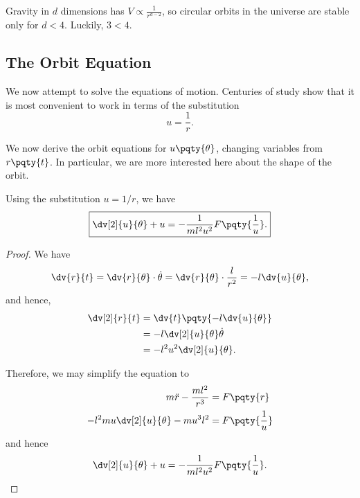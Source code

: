 Gravity in \(d\) dimensions has \(V \propto \frac{1}{r^{d - 2}}\), so circular orbits in the universe are stable only for \(d < 4\). Luckily, \(3 < 4\).

\subsection{The Orbit Equation}

We now attempt to solve the equations of motion. Centuries of study show that it is most convenient to work in terms of the substitution
\begin{equation}
    u = \frac{1}{r}.
\end{equation}

We now derive the orbit equations for \(u\pqty{\theta}\), changing variables from \(r\pqty{t}\). In particular, we are more interested here about the shape of the orbit.

\begin{lemma}
    \label{lem:orbit-equation}%
    Using the substitution \(u = 1 / r\), we have
    \begin{equation}
        \boxed{\dv[2]{u}{\theta} + u = - \frac{1}{ml^2 u^2} F\pqty{\frac{1}{u}}.}
    \end{equation}
\end{lemma}

\begin{proof}
    We have
    \begin{equation}
        \dv{r}{t} = \dv{r}{\theta} \cdot \dot{\theta} = \dv{r}{\theta} \cdot \frac{l}{r^2} = -l \dv{u}{\theta},
    \end{equation}
    and hence,
    \begin{subequations}\begin{align}
        \dv[2]{r}{t} &= \dv{t} \pqty{- l \dv{u}{\theta}} \\
        &= - l \dv[2]{u}{\theta} \dot{\theta} \\
        &= - l^2 u^2 \dv[2]{u}{\theta}.
    \end{align}\end{subequations}
    
    Therefore, we may simplify the equation to
    \begin{subequations}\begin{align}
        m \ddot{r} - \frac{m l^2}{r^3} &= F\pqty{r} \\
        - l^2 m u \dv[2]{u}{\theta} - m u^3 l^2 &= F\pqty{\frac{1}{u}}
    \end{align}\end{subequations}
    and hence
    \begin{equation}
        \dv[2]{u}{\theta} + u = - \frac{1}{ml^2 u^2} F\pqty{\frac{1}{u}}.
    \end{equation}
\end{proof}

